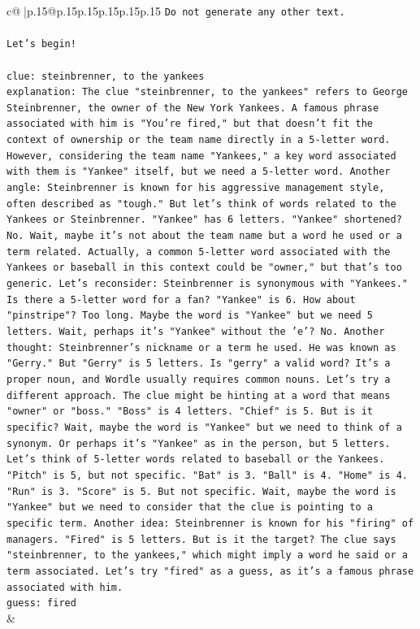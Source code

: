 \documentclass{article}
\begin{document}
{\begin{supertabular}{c@{$\;$}|p{.15\linewidth}@{}p{.15\linewidth}p{.15\linewidth}p{.15\linewidth}p{.15\linewidth}p{.15\linewidth}}
{{{\texttt{Do not generate any other text.} \\
\\ 
\texttt{Let's begin!} \\
\\ 
\texttt{clue: steinbrenner, to the yankees} \\
\texttt{explanation: The clue "steinbrenner, to the yankees" refers to George Steinbrenner, the owner of the New York Yankees. A famous phrase associated with him is "You're fired," but that doesn't fit the context of ownership or the team name directly in a 5{-}letter word. However, considering the team name "Yankees," a key word associated with them is "Yankee" itself, but we need a 5{-}letter word. Another angle: Steinbrenner is known for his aggressive management style, often described as "tough." But let's think of words related to the Yankees or Steinbrenner. "Yankee" has 6 letters. "Yankee" shortened? No. Wait, maybe it's not about the team name but a word he used or a term related. Actually, a common 5{-}letter word associated with the Yankees or baseball in this context could be "owner," but that's too generic. Let's reconsider: Steinbrenner is synonymous with "Yankees." Is there a 5{-}letter word for a fan? "Yankee" is 6. How about "pinstripe"? Too long. Maybe the word is "Yankee" but we need 5 letters. Wait, perhaps it's "Yankee" without the 'e'? No. Another thought: Steinbrenner's nickname or a term he used. He was known as "Gerry." But "Gerry" is 5 letters. Is "gerry" a valid word? It's a proper noun, and Wordle usually requires common nouns. Let's try a different approach. The clue might be hinting at a word that means "owner" or "boss." "Boss" is 4 letters. "Chief" is 5. But is it specific? Wait, maybe the word is "Yankee" but we need to think of a synonym. Or perhaps it's "Yankee" as in the person, but 5 letters. Let's think of 5{-}letter words related to baseball or the Yankees. "Pitch" is 5, but not specific. "Bat" is 3. "Ball" is 4. "Home" is 4. "Run" is 3. "Score" is 5. But not specific. Wait, maybe the word is "Yankee" but we need to consider that the clue is pointing to a specific term. Another idea: Steinbrenner is known for his "firing" of managers. "Fired" is 5 letters. But is it the target? The clue says "steinbrenner, to the yankees," which might imply a word he said or a term associated. Let's try "fired" as a guess, as it's a famous phrase associated with him.} \\
\texttt{guess: fired} \\
            }
        }
    }
    & \\ \\


\end{supertabular}}
\end{document}
